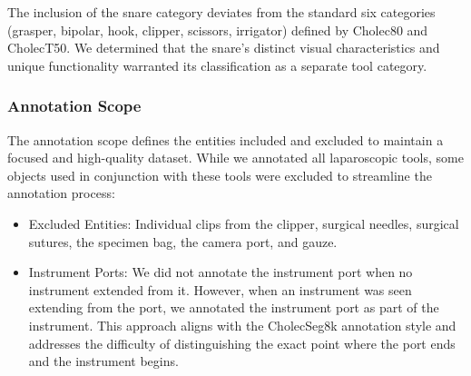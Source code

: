 The inclusion of the snare category deviates from the standard six categories (grasper, bipolar, hook, clipper, scissors, irrigator) defined by Cholec80 and CholecT50. We determined that the snare's distinct visual characteristics and unique functionality warranted its classification as a separate tool category. 




\subsubsection{Annotation Scope}
The annotation scope defines the entities included and excluded to maintain a focused and high-quality dataset. While we annotated all laparoscopic tools,  some objects used in conjunction with these tools were excluded to streamline the annotation process:
%
\begin{itemize}
    \item Excluded Entities: Individual clips from the clipper, surgical needles, surgical sutures, the specimen bag, the camera port, and gauze.
    \item Instrument Ports: We did not annotate the instrument port when no instrument extended from it. However, when an instrument was seen extending from the port, we annotated the instrument port as part of the instrument. This approach aligns with the CholecSeg8k annotation style and addresses the difficulty of distinguishing the exact point where the port ends and the instrument begins. 
    
\end{itemize}


